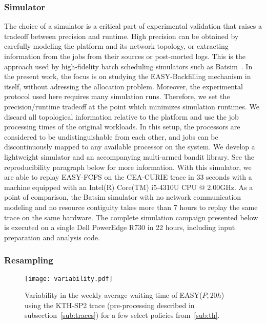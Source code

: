 \documentclass[sigconf]{acmart}
\begin{document}
\subsubsection{Simulator}

The choice of a simulator is a critical part of experimental validation that
raises a tradeoff between precision and runtime. High precision can be obtained
by carefully modeling the platform and its network topology, or extracting
information from the jobs from their sources or post-morted logs. This is the
approach used by high-fidelity batch scheduling simulators such as
Batsim~\cite{batsim}. In the present work, the focus is on studying the
EASY-Backfilling mechanism in itself, without adressing the allocation problem.
Moreover, the experimental protocol used here requires many simulation runs.
Therefore, we set the precision/runtime tradeoff at the point which minimizes
simulation runtimes. We discard all topological information relative to the
platform and use the job processing times of the original workloads. In this
setup, the processors are considered to be undistinguishable from each other,
and jobs can be discontinuously mapped to any available processor on the
system. We develop a lightweight simulator\cite{ocst} and an accompanying
multi-armed bandit library\cite{obandit}. See the reproducibility paragraph
below for more information.  With this simulator, we are able to replay
EASY-FCFS on the CEA-CURIE trace in 33 seconds with a machine equipped with an
Intel(R) Core(TM) i5-4310U CPU @ 2.00GHz. As a point of comparison, the Batsim
simulator with no network communication modeling and no resource contiguity
takes more than 7 hours to replay the same trace on the same hardware. The complete
simulation campaign presented below is executed on a single Dell PowerEdge R730 in 22
hours, including input preparation and analysis code.

\subsubsection{Resampling}
\label{ssub:resampling}

\begin{figure*}[ht]
  \centering
  \texttt{[image: variability.pdf]}
  \caption{Variability in the weekly average waiting time of EASY($P,20h$) using the KTH-SP2 trace (pre-processing described in subsection~\ref{sub:traces}) for
  a few select policies from~\ref{sub:th}.}
  \label{fig:variability}
\end{figure*}
\end{document}
